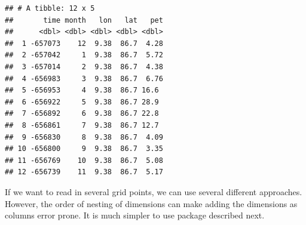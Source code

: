 \documentclass[krantz2]{krantz}\usepackage{knitr}%
\begin{document}
\begin{knitrout}\footnotesize
{}\color{fgcolor}\begin{kframe}
\begin{alltt}
 \hlkwb{<-}
    \hlstd{(} \hlstd{=}  \hlstd{),}
            \hlstd{=} \hlstd{(}\hlstd{(}\hlstd{)} \hlopt{+} 
            \hlstd{= longitude[}\hlstd{],}
            \hlstd{= latitude[}\hlstd{],}
            \hlstd{=}  \hlstd{)[}\hlstd{,} \hlstd{, ]}
           \hlstd{)}
\end{alltt}
\begin{verbatim}
## # A tibble: 12 x 5
##       time month   lon   lat   pet
##      <dbl> <dbl> <dbl> <dbl> <dbl>
##  1 -657073    12  9.38  86.7  4.28
##  2 -657042     1  9.38  86.7  5.72
##  3 -657014     2  9.38  86.7  4.38
##  4 -656983     3  9.38  86.7  6.76
##  5 -656953     4  9.38  86.7 16.6 
##  6 -656922     5  9.38  86.7 28.9 
##  7 -656892     6  9.38  86.7 22.8 
##  8 -656861     7  9.38  86.7 12.7 
##  9 -656830     8  9.38  86.7  4.09
## 10 -656800     9  9.38  86.7  3.35
## 11 -656769    10  9.38  86.7  5.08
## 12 -656739    11  9.38  86.7  5.17
\end{verbatim}
\end{kframe}
\end{knitrout}

If we want to read in several grid points, we can use several different approaches. However, the order of nesting of dimensions can make adding the dimensions as columns error prone. It is much simpler to use package  described next.

\subsection[tidync]{}
\end{document}
